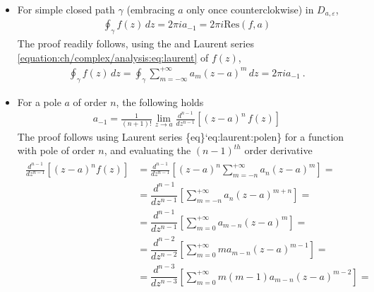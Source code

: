 \documentclass[letterpaper,10pt,english]{jupyterBook}
\begin{document}
\begin{itemize}
\item {} 
\sphinxAtStartPar
For simple closed path \(\gamma\) (embracing \(a\) only once counter\sphinxhyphen{}clokwise) in \(D_{a, \varepsilon}\),
\begin{equation}\label{equation:ch/complex/analysis:eq:residue-thm:0}
\begin{split}\oint_{\gamma} f(z) \, dz = 2 \pi i a_{-1} = 2 \pi i \text{Res}(f,a)\end{split}
\end{equation}
\sphinxAtStartPar
The proof readily follows, using the {\hyperref[\detokenize{ch/complex/analysis:complex-analysis-useful-int-path-independence-z-n}]{}} and Laurent series \eqref{equation:ch/complex/analysis:eq:laurent} of \(f(z)\),
\begin{equation*}
\begin{split}\oint_{\gamma} f(z) \, dz = \oint_{\gamma} \sum_{m=-\infty}^{+\infty} a_m (z-a)^m \, dz = 2 \pi i a_{-1} \ .\end{split}
\end{equation*}
\item {} 
\sphinxAtStartPar
For a pole \(a\) of order \(n\), the following holds
\begin{equation*}
\begin{split}a_{-1} =  \frac{1}{(n+1)!} \lim_{z \rightarrow a} \frac{d^{n-1}}{dz^{n-1}} \left[ (z-a)^n \, f(z) \right]\end{split}
\end{equation*}
\sphinxAtStartPar
The proof follows using Laurent series \{eq\}`eq:laurent:pole\sphinxhyphen{}n\} for a function with pole of order \(n\), and evaluating the \((n-1)^{th}\) order derivative
\begin{equation*}
\begin{split}\begin{aligned}
   \frac{d^{n-1}}{dz^{n-1}} \left[ (z-a)^n f(z) \right] 
    & = \frac{d^{n-1}}{dz^{n-1}} \left[ (z-a)^n \sum_{m=-n}^{+\infty} a_n (z-a)^m \right] = \\
    & = \dfrac{d^{n-1}}{dz^{n-1}} \left[ \sum_{m=-n}^{+\infty} a_n (z-a)^{m+n} \right] = \\
    & = \dfrac{d^{n-1}}{dz^{n-1}} \left[ \sum_{m=0}^{+\infty} a_{m-n} (z-a)^{m} \right] = \\
    & = \dfrac{d^{n-2}}{dz^{n-2}} \left[ \sum_{m=0}^{+\infty} m a_{m-n} (z-a)^{m-1} \right] = \\
    & = \dfrac{d^{n-3}}{dz^{n-3}} \left[ \sum_{m=0}^{+\infty} m(m-1) a_{m-n} (z-a)^{m-2} \right] = \\

\end{aligned}
\end{split}
\end{equation*}
\end{itemize}
\end{document}
